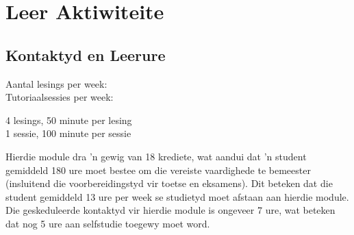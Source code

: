 \section{Leer Aktiwiteite}
    \subsection{Kontaktyd en Leerure}
        \begin{minipage}{0.4\linewidth}
            Aantal lesings per week: \\
            Tutoriaalsessies per week:
        \end{minipage}
        \begin{minipage}{0.4\linewidth}
            4 lesings, 50 minute per lesing \\
            1 sessie, 100 minute per sessie
        \end{minipage}

        Hierdie module dra 'n gewig van 18 krediete, wat aandui dat 'n
        student gemiddeld 180 ure moet bestee om die vereiste
        vaardighede te bemeester (insluitend die voorbereidingstyd vir
        toetse en eksamens).  Dit beteken dat die student gemiddeld 13
        ure per week se studietyd moet afstaan aan hierdie module.
        Die geskeduleerde kontaktyd vir hierdie module is ongeveer 7
        ure, wat beteken dat nog 5 ure aan selfstudie toegewy moet
        word.
    
